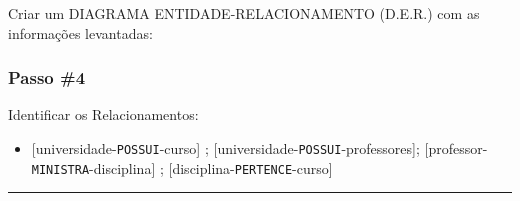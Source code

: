 \documentclass[
]{book}
\makeatletter
\newcommand*\pandocbounded[1]{%
  \sbox\pandoc@box{#1}%
  \Gscale@div\@tempa{\textheight}{\dimexpr\ht\pandoc@box+\dp\pandoc@box\relax}%
  \Gscale@div\@tempb{\linewidth}{\wd\pandoc@box}%
  \ifdim\@tempb\p@<\@tempa\p@\let\@tempa\@tempb\fi%
  \ifdim\@tempa\p@<\p@\scalebox{\@tempa}{\usebox\pandoc@box}%
  \else\usebox{\pandoc@box}%
  \fi%
}
\providecommand{\tightlist}{%
  \setlength{\itemsep}{0pt}\setlength{\parskip}{0pt}}
\makeatother
\begin{document}
Criar um DIAGRAMA ENTIDADE-RELACIONAMENTO (D.E.R.) com as informações levantadas:

\pandocbounded{}

\pandocbounded{}

\pandocbounded{}

\pandocbounded{}

\subsubsection{Passo \#4}\label{passo-4}

Identificar os Relacionamentos:

\begin{itemize}
\tightlist
\item
  {[}universidade-\texttt{POSSUI}-curso{]} ; {[}universidade-\texttt{POSSUI}-professores{]}; {[}professor-\texttt{MINISTRA}-disciplina{]} ; {[}disciplina-\texttt{PERTENCE}-curso{]}
\end{itemize}

\pandocbounded{}

\begin{center}\rule{0.5\linewidth}{0.5pt}\end{center}
\end{document}
